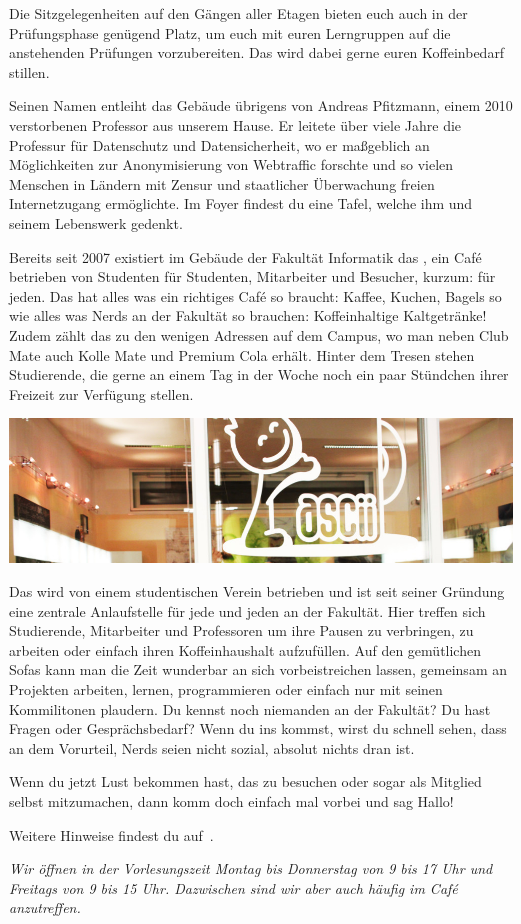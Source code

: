 Die Sitzgelegenheiten auf den Gängen aller Etagen bieten euch auch in der Prüfungsphase genügend Platz, um euch mit euren Lerngruppen auf die anstehenden Prüfungen vorzubereiten. Das \ascii{} wird dabei gerne euren Koffeinbedarf stillen.

Seinen Namen entleiht das Gebäude übrigens von Andreas Pfitzmann, einem 2010 verstorbenen Professor aus unserem Hause.
Er leitete über viele Jahre die Professur für Datenschutz und Datensicherheit, wo er maßgeblich an Möglichkeiten zur Anonymisierung von Webtraffic forschte und so vielen Menschen in Ländern mit Zensur und staatlicher Überwachung freien Internetzugang ermöglichte.
Im Foyer findest du eine Tafel, welche ihm und seinem Lebenswerk gedenkt.

\pagebreak


Bereits seit 2007 existiert im Gebäude der Fakultät Informatik das \ascii{}, ein Café betrieben von Studenten für Studenten, Mitarbeiter und Besucher, kurzum: für jeden.
Das \ascii{} hat alles was ein richtiges Café so braucht: Kaffee, Kuchen, Bagels so wie alles was Nerds an der Fakultät so brauchen: Koffeinhaltige Kaltgetränke!
Zudem zählt das \ascii{} zu den wenigen Adressen auf dem Campus, wo man neben Club Mate auch Kolle Mate und Premium Cola erhält.
Hinter dem Tresen stehen Studierende, die gerne an einem Tag in der Woche noch ein paar Stündchen ihrer Freizeit zur Verfügung stellen.

\includegraphics[width=\linewidth]{img/ascii.jpg}

Das \ascii{} wird von einem studentischen Verein betrieben und ist seit seiner Gründung eine zentrale Anlaufstelle für jede und jeden an der Fakultät.
Hier treffen sich Studierende, Mitarbeiter und Professoren um ihre Pausen zu verbringen,
zu arbeiten oder einfach ihren Koffeinhaushalt aufzufüllen.
Auf den gemütlichen Sofas kann man die Zeit wunderbar an sich vorbeistreichen lassen,
gemeinsam an Projekten arbeiten, lernen, programmieren oder einfach nur mit seinen Kommilitonen plaudern.
Du kennst noch niemanden an der Fakultät?
Du hast Fragen oder Gesprächsbedarf?
Wenn du ins \ascii{} kommst, wirst du schnell sehen, dass an dem Vorurteil, Nerds seien nicht sozial, absolut nichts dran ist.

Wenn du jetzt Lust bekommen hast, das \ascii{} zu besuchen oder sogar als Mitglied selbst mitzumachen, dann komm doch einfach mal vorbei und sag Hallo!

Weitere Hinweise findest du auf~.

\textit{Wir öffnen in der Vorlesungszeit Montag bis Donnerstag von 9 bis 17 Uhr und Freitags von 9 bis 15 Uhr. Dazwischen sind wir aber auch häufig im Café anzutreffen.}
